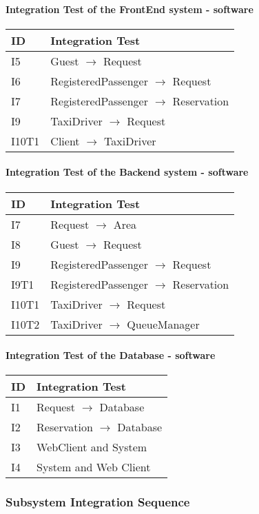		\paragraph{Integration Test of the FrontEnd system - software}
		\begin{tabular}{p{2cm} | p{10cm}}
			\hline
			\textbf{ID} & \textbf{Integration Test} \\
			\hline
			I5 & Guest $\rightarrow$ Request \\
			\hline
			I6 & RegisteredPassenger $\rightarrow$ Request \\
			\hline
			I7 & RegisteredPassenger $\rightarrow$ Reservation \\
			\hline
			I9 & TaxiDriver $\rightarrow$ Request \\
			\hline
			I10T1 & Client $\rightarrow$ TaxiDriver \\
			\hline
		\end{tabular}
		\paragraph{Integration Test of the Backend system - software}
		\begin{tabular}{p{2cm} | p{10cm}}
			\hline
			\textbf{ID} & \textbf{Integration Test} \\
			\hline
			I7 & Request $\rightarrow$ Area \\
			\hline
			I8 & Guest $\rightarrow$ Request \\
			\hline
			I9 & RegisteredPassenger $\rightarrow$ Request \\
			\hline
			I9T1 & RegisteredPassenger $\rightarrow$ Reservation \\
			\hline
			I10T1 & TaxiDriver $\rightarrow$ Request \\
			\hline
			I10T2 & TaxiDriver $\rightarrow$ QueueManager \\
			\hline
		\end{tabular}
		\paragraph{Integration Test of the Database - software}
		\begin{tabular}{p{2cm} | p{10cm}}
			\hline
			\textbf{ID} & \textbf{Integration Test} \\
			\hline
			I1 & Request $\rightarrow$ Database \\
			\hline
			I2 & Reservation $\rightarrow$ Database \\
			\hline
			I3 & WebClient and System \\
			\hline
			I4 & System and Web Client \\
			\hline
		\end{tabular}
		\subsubsection{Subsystem Integration Sequence}